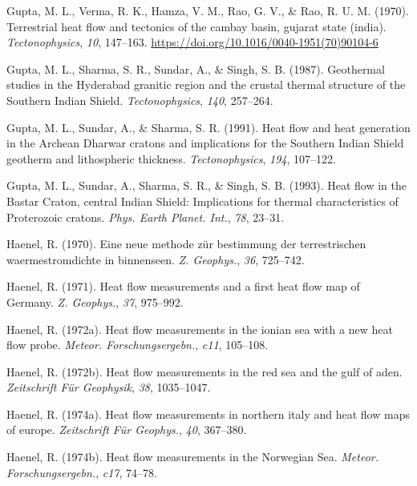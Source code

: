 \begin{CSLReferences}{1}{1}
\leavevmode{}%
Gupta, M. L., Verma, R. K., Hamza, V. M., Rao, G. V., \& Rao, R. U. M. (1970). Terrestrial heat flow and tectonics of the cambay basin, gujarat state (india). \emph{Tectonophysics}, \emph{10}, 147--163. \url{https://doi.org/10.1016/0040-1951(70)90104-6}

\leavevmode{}%
Gupta, M. L., Sharma, S. R., Sundar, A., \& Singh, S. B. (1987). Geothermal studies in the {Hyderabad} granitic region and the crustal thermal structure of the {Southern Indian Shield}. \emph{Tectonophysics}, \emph{140}, 257--264.

\leavevmode{}%
Gupta, M. L., Sundar, A., \& Sharma, S. R. (1991). Heat flow and heat generation in the {Archean Dharwar} cratons and implications for the {Southern Indian Shield} geotherm and lithospheric thickness. \emph{Tectonophysics}, \emph{194}, 107--122.

\leavevmode{}%
Gupta, M. L., Sundar, A., Sharma, S. R., \& Singh, S. B. (1993). Heat flow in the {Bastar Craton}, central {Indian Shield}: Implications for thermal characteristics of {Proterozoic} cratons. \emph{Phys. Earth Planet. Int.}, \emph{78}, 23--31.

\leavevmode{}%
Haenel, R. (1970). Eine neue methode zür bestimmung der terrestrischen waermestromdichte in binnenseen. \emph{Z. Geophys.}, \emph{36}, 725--742.

\leavevmode{}%
Haenel, R. (1971). Heat flow measurements and a first heat flow map of {Germany}. \emph{Z. Geophys.}, \emph{37}, 975--992.

\leavevmode{}%
Haenel, R. (1972a). Heat flow measurements in the ionian sea with a new heat flow probe. \emph{Meteor. Forschungsergebn.}, \emph{c11}, 105--108.

\leavevmode{}%
Haenel, R. (1972b). Heat flow measurements in the red sea and the gulf of aden. \emph{Zeitschrift Für Geophysik}, \emph{38}, 1035--1047.

\leavevmode{}%
Haenel, R. (1974a). Heat flow measurements in northern italy and heat flow maps of europe. \emph{Zeitschrift Für Geophys.}, \emph{40}, 367--380.

\leavevmode{}%
Haenel, R. (1974b). Heat flow measurements in the {Norwegian Sea}. \emph{Meteor. Forschungsergebn.}, \emph{c17}, 74--78.


\end{CSLReferences}
